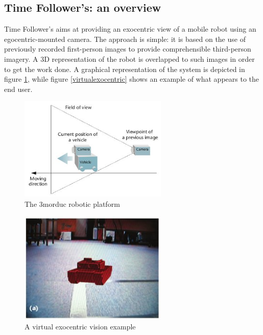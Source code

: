 \subsection{Time Follower's: an overview}
Time Follower's aims at providing an exocentric view of a mobile 
robot using an egocentric-mounted camera. The approach is simple: it is 
based on the use of previously recorded first-person images to provide 
comprehensible third-person imagery. A 3D representation of the robot 
is overlapped to such images in order to get the work done. A graphical
representation of the system is depicted in figure \ref{fig:exocentric}, 
while figure \ref{virtualexocentric} shows an example of what appears 
to the end user.
%
\begin{figure}[!h]
  \begin{center}
    \includegraphics[width=200pt]{img/exocentric_vision}
    \caption{The 3morduc robotic platform}
    \label{fig:exocentric}
  \end{center}
\end{figure}
%
\begin{figure}[!h]
  \begin{center}
    \includegraphics[width=200pt]{img/virtual_exocentric}  %
    \caption{A virtual exocentric vision example}
    \label{fig:virtualexocentric}
  \end{center}
\end{figure}
%

